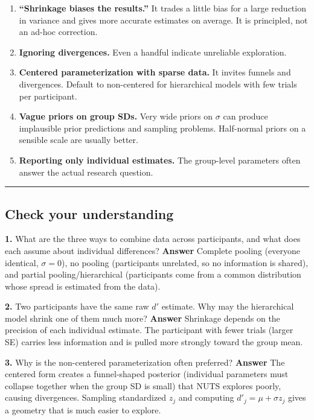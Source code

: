 \begin{enumerate}
\def\labelenumi{\arabic{enumi}.}
\tightlist
\item
  \textbf{``Shrinkage biases the results.''} It trades a little bias for
  a large reduction in variance and gives more accurate estimates on
  average. It is principled, not an ad-hoc correction.
\item
  \textbf{Ignoring divergences.} Even a handful indicate unreliable
  exploration.
\item
  \textbf{Centered parameterization with sparse data.} It invites
  funnels and divergences. Default to non-centered for hierarchical
  models with few trials per participant.
\item
  \textbf{Vague priors on group SDs.} Very wide priors on \(\sigma\) can
  produce implausible prior predictions and sampling problems.
  Half-normal priors on a sensible scale are usually better.
\item
  \textbf{Reporting only individual estimates.} The group-level
  parameters often answer the actual research question.
\end{enumerate}

\begin{center}\rule{0.5\linewidth}{0.5pt}\end{center}

\subsection{Check your understanding}

\textbf{1.} What are the three ways to combine data across participants,
and what does each assume about individual differences? \textbf{Answer}
Complete pooling (everyone identical, \(\sigma = 0\)), no pooling
(participants unrelated, so no information is shared), and partial
pooling/hierarchical (participants come from a common distribution whose
spread is estimated from the data).

\textbf{2.} Two participants have the same raw \(d'\) estimate. Why may
the hierarchical model shrink one of them much more? \textbf{Answer}
Shrinkage depends on the precision of each individual estimate. The
participant with fewer trials (larger SE) carries less information and
is pulled more strongly toward the group mean.

\textbf{3.} Why is the non-centered parameterization often preferred?
\textbf{Answer} The centered form creates a funnel-shaped posterior
(individual parameters must collapse together when the group SD is
small) that NUTS explores poorly, causing divergences. Sampling
standardized \(z_j\) and computing \(d'_j = \mu + \sigma z_j\) gives a
geometry that is much easier to explore.

